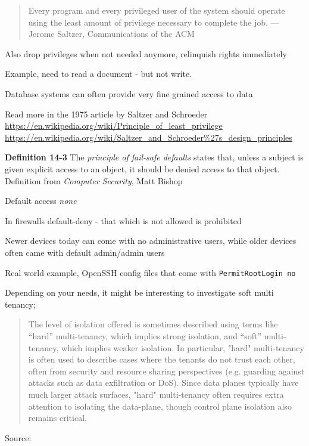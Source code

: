 \documentclass[Screen16to9,17pt]{foils}
\begin{document}

\begin{quote}
Every program and every privileged user of the system should operate using the least amount of privilege necessary to complete the job. — Jerome Saltzer, Communications of the ACM
\end{quote}

\begin{list1}
\item Also drop privileges when not needed anymore, relinquish rights immediately
\item Example, need to read a document - but not write.
\item Database systems can often provide very fine grained access to data
\end{list1}

Read more in the 1975 article by Saltzer and Schroeder\\
\url{https://en.wikipedia.org/wiki/Principle_of_least_privilege}\\
\url{https://en.wikipedia.org/wiki/Saltzer_and_Schroeder%27s_design_principles}


\begin{list1}
\item {\bf Definition 14-3} The \emph{principle of fail-safe defaults} states that, unless a subject is given explicit access to an object, it should be denied access to that object.\\
Definition from \emph{Computer Security}, Matt Bishop
\item Default access \emph{none}
\item In firewalls default-deny - that which is not allowed is prohibited
\item Newer devices today can come with no administrative users, while older devices often came with default admin/admin users
\item Real world example, OpenSSH config files that come with \verb+PermitRootLogin no+
\end{list1}



Depending on your needs, it might be interesting to investigate soft multi tenancy;

\begin{quote}
The level of isolation offered is sometimes described using terms like “hard” multi-tenancy, which implies strong isolation, and “soft” multi-tenancy, which implies weaker isolation. In particular, "hard" multi-tenancy is often used to describe cases where the tenants do not trust each other, often from security and resource sharing perspectives (e.g. guarding against attacks such as data exfiltration or DoS). Since data planes typically have much larger attack surfaces, "hard" multi-tenancy often requires extra attention to isolating the data-plane, though control plane isolation also remains critical.
\end{quote}
Source: 
\end{document}

